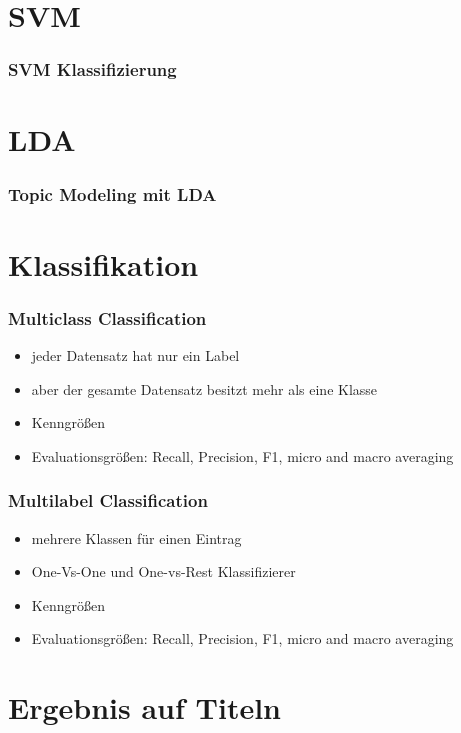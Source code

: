 \documentclass[12pt, xcolor=table]{beamer}
\begin{document}
\section{SVM} %
\label{sec:SVM}

\begin{frame}
    \frametitle{SVM Klassifizierung}
\end{frame}

\section{LDA} %
\label{sec:LDA}

\begin{frame}
    \frametitle{Topic Modeling mit LDA}
\end{frame}
\section{Klassifikation} %
\label{sec:Klassifikation}

\begin{frame}
    \frametitle{Multiclass Classification}
    \begin{itemize}
        \item jeder Datensatz hat nur ein Label
        \item aber der gesamte Datensatz besitzt mehr als eine Klasse
        \item Kenngrößen
        \item Evaluationsgrößen: Recall, Precision, F1, micro and macro averaging
    \end{itemize}
\end{frame}

\begin{frame}
    \frametitle{Multilabel Classification}
    \begin{itemize}
        \item mehrere Klassen für einen Eintrag
        \item One-Vs-One und One-vs-Rest Klassifizierer
        \item Kenngrößen
        \item Evaluationsgrößen: Recall, Precision, F1, micro and macro averaging
    \end{itemize}
\end{frame}

\section{Ergebnis auf Titeln} %
\label{sec:Ergebnis}
\end{document}
